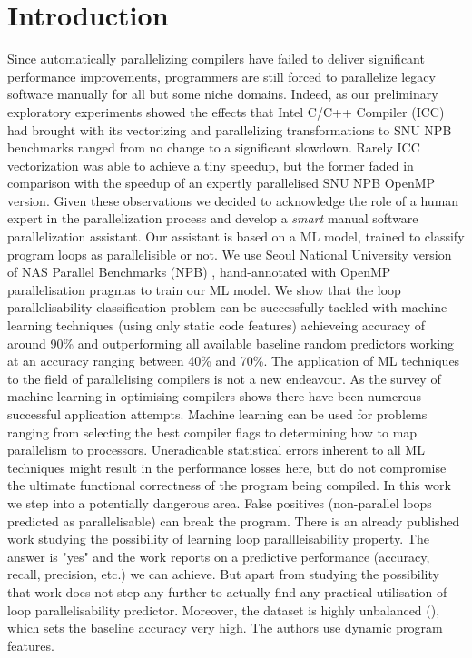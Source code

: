 \documentclass{acaces}
\begin{document}

\section{Introduction}
\quad Since automatically parallelizing compilers have failed to deliver significant performance improvements, programmers are still forced to parallelize legacy software manually for all but some niche domains. Indeed, as our preliminary exploratory experiments showed the effects that Intel C/C++ Compiler (ICC) had brought with its vectorizing and parallelizing transformations to SNU NPB benchmarks ranged from no change to a significant slowdown. Rarely ICC vectorization was able to achieve a tiny speedup, but the former faded in comparison with the speedup of an expertly parallelised SNU NPB OpenMP version. Given these observations we decided to acknowledge the role of a human expert in the parallelization process and develop a \textit{smart} manual software parallelization assistant.\newline\null
\quad Our assistant is based on a ML model, trained to classify program loops as parallelisible or not. We use Seoul National University version of NAS Parallel Benchmarks (NPB) \cite{nasa-parallel-benchmarks}, \cite{snu-npb-benchmarks} hand-annotated with OpenMP parallelisation pragmas to train our ML model. We show that the loop parallelisability classification problem can be successfully tackled with machine learning techniques (using only static code features) achieveing accuracy of around 90\% and outperforming all available baseline random predictors working at an accuracy ranging between 40\% and 70\%.\newline\null
\quad The application of ML techniques to the field of parallelising compilers is not a new endeavour. As the survey of machine learning in optimising compilers \cite{mob-ml} shows there have been numerous successful application attempts. Machine learning can be used for problems ranging from selecting the best compiler flags to determining how to map parallelism to processors. Uneradicable statistical errors inherent to all ML techniques might result in the performance losses here, but do not compromise the ultimate functional correctness of the program being compiled. In this work we step into a potentially dangerous area. False positives (non-parallel loops predicted as parallelisable) can break the program. There is an already published work \cite{fried_ea:2013:icmla} studying the possibility of learning loop parallleisability property. The answer is "yes" and the work reports on a predictive performance (accuracy, recall, precision, etc.) we can achieve. But apart from studying the possibility that work does not step any further to actually find any practical utilisation of loop parallelisability predictor. Moreover, the dataset is highly unbalanced (), which sets the baseline accuracy very high. The authors use dynamic program features.\newline\null
\end{document}
